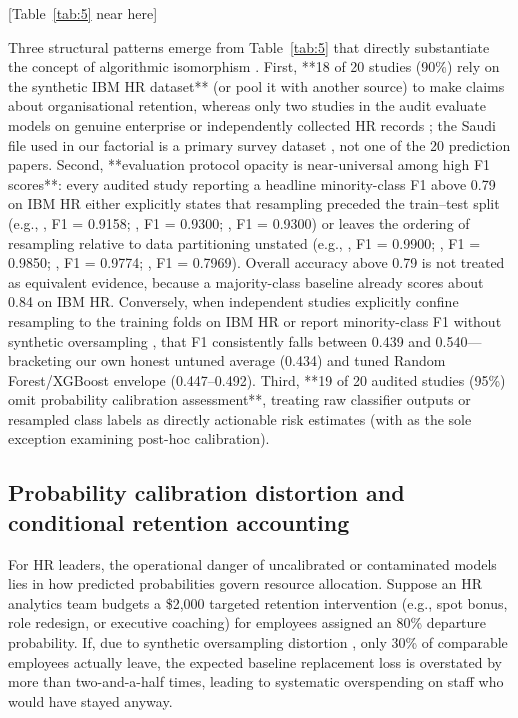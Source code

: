\documentclass[12pt,a4paper]{article}
\begin{document}
\begin{center}
[Table~\ref{tab:5} near here]
\end{center}

Three structural patterns emerge from Table~\ref{tab:5} that directly substantiate the concept of algorithmic isomorphism \parencite{ref59,ref51}. First, **18 of 20 studies (90\%) rely on the synthetic IBM HR dataset** (or pool it with another source) to make claims about organisational retention, whereas only two studies in the audit evaluate models on genuine enterprise or independently collected HR records \parencite{ref64,ref26}; the Saudi file used in our factorial is a primary survey dataset \parencite{ref4}, not one of the 20 prediction papers. Second, **evaluation protocol opacity is near-universal among high F1 scores**: every audited study reporting a headline minority-class F1 above 0.79 on IBM HR either explicitly states that resampling preceded the train--test split (e.g., \cite{ref19}, F1 = 0.9158; \cite{ref29}, F1 = 0.9300; \cite{ref67}, F1 = 0.9300) or leaves the ordering of resampling relative to data partitioning unstated (e.g., \cite{ref2}, F1 = 0.9900; \cite{ref66}, F1 = 0.9850; \cite{ref3}, F1 = 0.9774; \cite{ref18}, F1 = 0.7969). Overall accuracy above 0.79 is not treated as equivalent evidence, because a majority-class baseline already scores about 0.84 on IBM HR. Conversely, when independent studies explicitly confine resampling to the training folds on IBM HR \parencite{ref16,ref15} or report minority-class F1 without synthetic oversampling \parencite{ref1,ref68}, that F1 consistently falls between 0.439 and 0.540---bracketing our own honest untuned average (0.434) and tuned Random Forest/XGBoost envelope (0.447--0.492). Third, **19 of 20 audited studies (95\%) omit probability calibration assessment**, treating raw classifier outputs or resampled class labels as directly actionable risk estimates (with \cite{ref25} as the sole exception examining post-hoc calibration).

\subsection{Probability calibration distortion and conditional retention accounting}
\label{sec:budget}
For HR leaders, the operational danger of uncalibrated or contaminated models lies in how predicted probabilities govern resource allocation. Suppose an HR analytics team budgets a \$2,000 targeted retention intervention (e.g., spot bonus, role redesign, or executive coaching) for employees assigned an 80\% departure probability. If, due to synthetic oversampling distortion \parencite{ref9,ref10}, only 30\% of comparable employees actually leave, the expected baseline replacement loss is overstated by more than two-and-a-half times, leading to systematic overspending on staff who would have stayed anyway.
\end{document}
